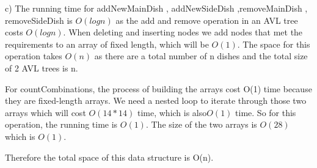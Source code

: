 \documentclass[12pt]{article}
\begin{document}
c) 
The running time for addNewMainDish , addNewSideDish ,removeMainDish , removeSideDish is $O(logn)$ as the add and remove operation in an AVL tree costs $O(logn)$. When deleting and inserting nodes we add nodes that met the requirements to an array of fixed length, which will be $O(1)$.   The space for this operation takes $O(n)$ as there are a total number of n dishes and the total size of 2 AVL trees is n.

For countCombinations, the process of building the arrays cost O(1) time because they are fixed-length arrays. We need a nested loop to iterate through those two arrays which will cost $O(14*14)$ time, which is also$ O(1)$ time. So for this operation, the running time is $O(1)$. The size of the two arrays is $O(28)$ which is $O(1)$.

Therefore the total space of this data structure is O(n).
\end{document}
